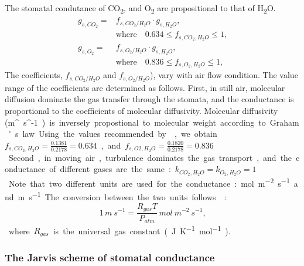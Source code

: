 \documentclass[essd]{copernicus}
\begin{document}
The stomatal condutance of CO\textsubscript{2}, and O\textsubscript{2} are
propositional to that of H\textsubscript{2}O.
\begin{align}
  g_{s,CO_2} = & f_{s,CO_2/H_2O} \cdotp g_{s,H_2O} \text{,} \\
               & \text{where} \quad 0.634 \leq f_{s,CO_2,H_2O} \leq 1 \text{,} \nonumber \\
  g_{s,O_2} =  & f_{s,O_2/H_2O} \cdotp g_{s,H_2O} \text{,} \\
               & \text{where} \quad 0.836 \leq f_{s,O_2,H_2O} \leq 1 \text{,} \nonumber
\end{align}
The coefficients, \(f_{s,CO_2/H_2O}\) and \(f_{s,O_2/H_2O}\)), vary with air
flow condition. The value range of the coefficients are determined as follows.
First, in still air, molecular diffusion dominate the gas transfer through the
stomata, and the conductance is proportional to the coefficients of molecular
diffusivity. Molecular diffusivity (\si{m^~s^{-1}}) is inversely propostional to
molecular weight according to Graham's law. Using the values recommended by
\citet[Table 8]{massman1998AE}, we obtain \(f_{s,CO_2,H_2O} =
\frac{0.1381}{0.2178} = 0.634\), and \(f_{s,O2,H_2O} = \frac{0.1820}{0.2178} =
0.836\). Second, in moving air, turbulence dominates the gas transport, and the
conductance of different gases are the same: \(k_{CO_2,H_2O}=k_{O_2,H_2O}=1\).

Note that two different units are used for the conductance:
\si{mol~m^{-2}~s^{-1}} and \si{m~s^{-1}}. The conversion between the two units
follows \citet{cowan1978}:
\begin{equation}
  1\,\si{m~s^{-1}} = \frac{R_{gas}T}{P_{atm}} \, \si{mol~m^{-2}~s^{-1}} \text{,}
\end{equation}
where \(R_{gas}\) is the universal gas constant (\si{J~K^{-1}~mol^{-1}}).


\subsubsection{The Jarvis scheme of stomatal conductance}
\end{document}
